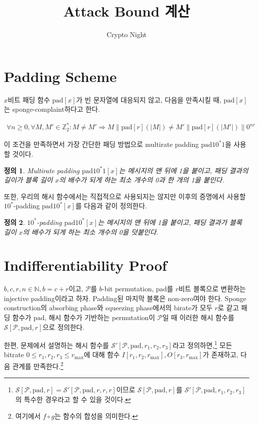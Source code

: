 \documentclass{article}
\title{Attack Bound 계산}
\author{Crypto Night}
\newtheorem{definition}{정의}
\begin{document}
  \maketitle

  \section{Padding Scheme}
  \(x\)비트 패딩 함수 \(\mathrm{pad}[x]\)가 빈 문자열에 대응되지 않고, 다음을 만족시킬 때, \(\mathrm{pad}[x]\)는 sponge-complaint하다고 한다.\cite{guido_cryptographic_2011}

  \begin{align*}
    \forall n \geq 0, \forall M, M' \in \mathbb{Z}^*_2 : M \not=M' \Rightarrow M \| \mathrm{pad}[r](|M|) \not= M' \| \mathrm{pad}[r](|M'|) \| 0^{nr}
  \end{align*}

  이 조건을 만족하면서 가장 간단한 패딩 방법으로 multirate padding \(\mathrm{pad10^*1}\)을 사용할 것이다.

  \begin{definition}
    Multirate padding \(\mathrm{pad10^*1}[x]\)는 메시지의 맨 뒤에 1을 붙이고, 패딩 결과의 길이가 블록 길이 \(x\)의 배수가 되게 하는 최소 개수의 0과 한 개의 1을 붙인다.
  \end{definition}

  또한, 우리의 해시 함수에서는 직접적으로 사용되지는 않지만 이후의 증명에서 사용할 \(10^*\)-padding \(\mathrm{pad10^*}[x]\)를 다음과 같이 정의한다.

  \begin{definition}
    \(10^*\)-padding \(\mathrm{pad10^*}[x]\)는 메시지의 맨 뒤에 1을 붙이고, 패딩 결과가 블록 길이 \(x\)의 배수가 되게 하는 최소 개수의 0을 덧붙인다.
  \end{definition}

  \section{Indifferentiability Proof}
  \(b, c, r, n \in \mathbb{N}, b = c + r\)이고, \(\mathcal{P}\)를 \(b\)-bit permutation, \(\mathrm{pad}\)를 \(r\)비트 블록으로 변환하는 injective padding이라고 하자. Padding된 마지막 블록은 non-zero여야 한다. Sponge construction의 absorbing phase와 squeezing phase에서의 birate가 모두 \(r\)로 같고 패딩 함수가 \(\mathrm{pad}\), 해시 함수가 기반하는 permutation이 \(\mathcal{P}\)일 때 이러한 해시 함수를 \(\mathcal{S}[\mathcal{P}, \mathrm{pad}, r]\)으로 정의한다.

  한편, 문제에서 설명하는 해시 함수를 \(\mathcal{S}'[\mathcal{P}, \mathrm{pad}, r_1, r_2, r_3]\)라고 정의하면,\footnote{\(\mathcal{S}[\mathcal{P}, \mathrm{pad}, r] = \mathcal{S}'[\mathcal{P}, \mathrm{pad}, r, r, r]\)이므로 \(\mathcal{S}[\mathcal{P}, \mathrm{pad}, r]\)를 \(\mathcal{S}'[\mathcal{P}, \mathrm{pad}, r_1, r_2, r_3]\)의 특수한 경우라고 할 수 있을 것이다.} 모든 bitrate \(0 \leq r_1, r_2, r_3 \leq r_\mathrm{max}\)에 대해 함수 \(I[r_1, r_2, r_\mathrm{max}], O[r_3, r_\mathrm{max}]\)가 존재하고, 다음 관계를 만족한다.\footnote{여기에서 \(f \circ g\)는 함수의 합성을 의미한다.}
\end{document}
